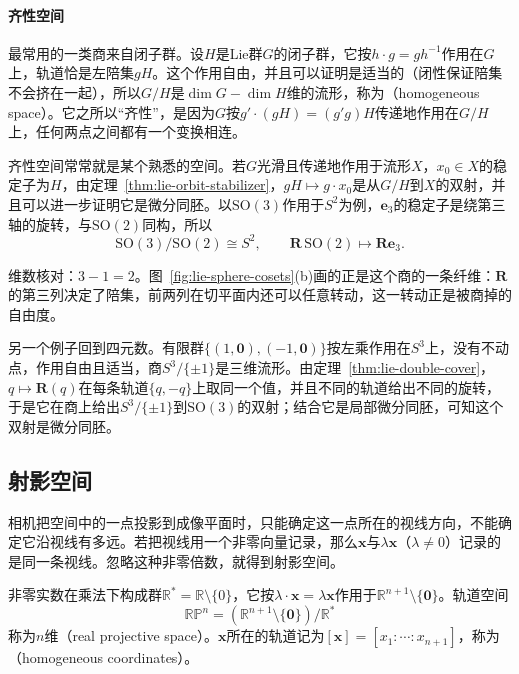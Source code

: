 \paragraph{齐性空间}
最常用的一类商来自闭子群。设$H$是Lie群$G$的闭子群，它按$h\cdot g=gh^{-1}$作用在$G$上，轨道恰是左陪集$gH$。这个作用自由，并且可以证明是适当的（闭性保证陪集不会挤在一起），所以$G/H$是$\dim G-\dim H$维的流形，称为（homogeneous space）。它之所以“齐性”，是因为$G$按$g'\cdot(gH)=(g'g)H$传递地作用在$G/H$上，任何两点之间都有一个变换相连。

齐性空间常常就是某个熟悉的空间。若$G$光滑且传递地作用于流形$X$，$x_0\in X$的稳定子为$H$，由定理~\ref{thm:lie-orbit-stabilizer}，$gH\mapsto g\cdot x_0$是从$G/H$到$X$的双射，并且可以进一步证明它是微分同胚。以$\mathrm{SO}(3)$作用于$S^2$为例，$\bm e_3$的稳定子是绕第三轴的旋转，与$\mathrm{SO}(2)$同构，所以
\begin{equation}
 \mathrm{SO}(3)/\mathrm{SO}(2)\cong S^2,\qquad \bm R\,\mathrm{SO}(2)\mapsto\bm R\bm e_3.
 \label{eq:lie-so3-so2}
\end{equation}

维数核对：$3-1=2$。图~\ref{fig:lie-sphere-cosets}(b)画的正是这个商的一条纤维：$\bm R$的第三列决定了陪集，前两列在切平面内还可以任意转动，这一转动正是被商掉的自由度。

另一个例子回到四元数。有限群$\{(1,\bm0),(-1,\bm0)\}$按左乘作用在$S^3$上，没有不动点，作用自由且适当，商$S^3/\{\pm1\}$是三维流形。由定理~\ref{thm:lie-double-cover}，$q\mapsto\bm R(q)$在每条轨道$\{q,-q\}$上取同一个值，并且不同的轨道给出不同的旋转，于是它在商上给出$S^3/\{\pm1\}$到$\mathrm{SO}(3)$的双射；结合它是局部微分同胚，可知这个双射是微分同胚。

\subsection{射影空间}
\label{sec:lie-projective-space}

相机把空间中的一点投影到成像平面时，只能确定这一点所在的视线方向，不能确定它沿视线有多远。若把视线用一个非零向量记录，那么$\bm x$与$\lambda\bm x$（$\lambda\neq0$）记录的是同一条视线。忽略这种非零倍数，就得到射影空间。

\begin{definition}[实射影空间]
\label{def:lie-projective-space}
非零实数在乘法下构成群$\mathbb R^*=\mathbb R\setminus\{0\}$，它按$\lambda\cdot\bm x=\lambda\bm x$作用于$\mathbb R^{n+1}\setminus\{\bm0\}$。轨道空间
\begin{equation}
 \mathbb{RP}^n=(\mathbb R^{n+1}\setminus\{\bm0\})/\mathbb R^*
 \label{eq:lie-rpn}
\end{equation}
称为$n$维（real projective space）。$\bm x$所在的轨道记为$[\bm x]=[x_1:\cdots:x_{n+1}]$，称为（homogeneous coordinates）。
\end{definition}

